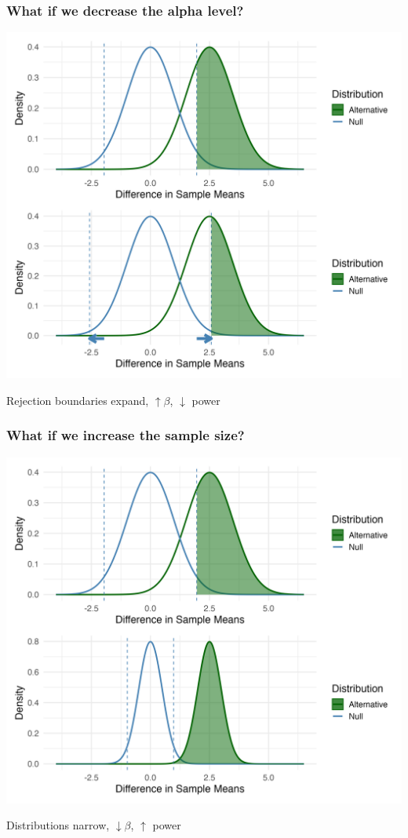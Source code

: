 \documentclass[slidestop,compress,mathserif]{beamer}
\begin{document}
\begin{frame}
\frametitle{What if we decrease the alpha level?}
  \begin{center}
      \includegraphics[height=0.75\textheight]{figures/whatif_baseline_alpha.png}
  \end{center}
  Rejection boundaries expand, $\uparrow\beta$, $\downarrow$ power
\end{frame}


\begin{frame}
\frametitle{What if we increase the sample size?}
  \begin{center}
      \includegraphics[height=0.75\textheight]{figures/whatif_baseline_samplesize.png}
  \end{center}
  Distributions narrow, $\downarrow\beta$, $\uparrow$ power
\end{frame}
\end{document}
